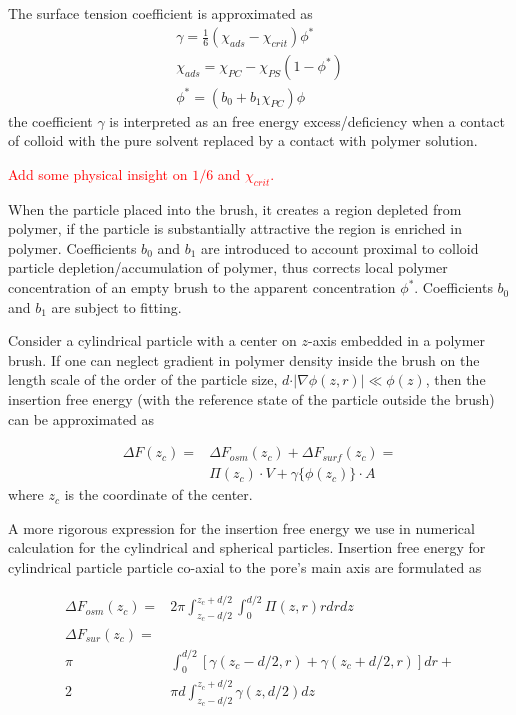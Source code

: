 \documentclass[12pt, a4paper]{article}
\newcommand\todo[1]{\textcolor{red}{#1}}
\begin{document}
The surface tension coefficient is approximated as
\begin{eqnarray}
    \gamma = \frac{1}{6}(\chi_{ads} - \chi_{crit})\phi^{\ast}
    \\
    \chi_{ads} = \chi_{PC} - \chi_{PS}(1-\phi^{\ast})
    \\
    \phi^{\ast}= (b_{0} + b_{1}\chi_{PC})\phi
\end{eqnarray}
the coefficient $\gamma$ is interpreted as an free energy excess/deficiency when a contact of colloid with the pure solvent replaced by a contact with polymer solution.

\todo{Add some physical insight on $1/6$ and $\chi_{crit}$.}

When the particle placed into the brush, it creates a region depleted from polymer, if the particle is substantially attractive the region is enriched in polymer.
Coefficients $b_0$ and $b_1$ are introduced to account proximal to colloid particle depletion/accumulation of polymer, thus corrects local polymer concentration of an empty brush to the apparent concentration $\phi^{\ast}$. 
Coefficients $b_0$ and $b_1$ are subject to fitting.

Consider a cylindrical particle with a center on $z$-axis embedded in a polymer brush. If one can neglect gradient in polymer density inside the brush on the length scale of the order of the particle size, $d\cdot \vert \nabla\phi(z,r) \vert \ll \phi(z)$, then the insertion free energy (with the reference state of the particle outside the brush) can be approximated as

\begin{equation}
	\begin{aligned}
		\Delta F(z_c)= &\Delta F_{osm}(z_c) + \Delta F_{surf}(z_c)=
		\\
		&\Pi(z_c)\cdot V + \gamma\{\phi(z_c)\}\cdot A
	\end{aligned}
	\label{F_ins_1}
\end{equation}
where $z_c$ is the coordinate of the center.

A more rigorous expression for the insertion free energy we use in numerical calculation for the cylindrical and spherical particles.
Insertion free energy for cylindrical particle particle co-axial to the pore's main axis are formulated as

\begin{align}
    \label{eq:cylinder_osm_fe}
    \Delta F_{osm}(z_c) =& 
    2 \pi \int_{z_c-d/2}^{z_c+d/2} \int_{0}^{d/2} \Pi(z,r) r dr dz
    \\
    \label{eq:cylinder_sur_fe}
    \Delta F_{sur}(z_c) = & 
    \\
    \nonumber
    \pi &\int_{0}^{d/2} \left[\gamma(z_c-d/2, r) + \gamma(z_c+d/2,r)\right] dr +
    \\
    \nonumber
    2 &\pi d \int_{z_c-d/2}^{z_c+d/2} \gamma(z,d/2) dz 
\end{align}
\end{document}
